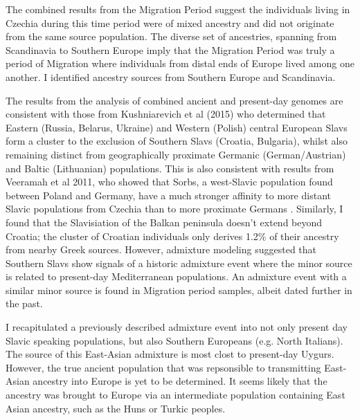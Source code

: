 The combined results from the Migration Period suggest the individuals living in Czechia during this time period were of mixed ancestry and did not originate from the same source population. The diverse set of ancestries, spanning from Scandinavia to Southern Europe imply that the Migration Period was truly a period of Migration where individuals from distal ends of Europe lived among one another. I identified ancestry sources from Southern Europe and Scandinavia. 

The results from the analysis of combined ancient and present-day genomes are consistent with those from Kushniarevich et al (2015) \cite{Kushniarevich23015} who determined that Eastern (Russia, Belarus, Ukraine) and Western (Polish) central European Slavs form a cluster to the exclusion of Southern Slavs (Croatia, Bulgaria), whilst also remaining distinct from geographically proximate Germanic (German/Austrian) and Baltic (Lithuanian) populations. This is also consistent with results from Veeramah et al 2011, who showed that Sorbs, a west-Slavic population found between Poland and Germany, have a much stronger affinity to more distant Slavic populations from Czechia than to more proximate Germans \cite{veeramah2011genetic}. Similarly, I found that the Slavisiation of the Balkan peninsula doesn't extend beyond Croatia; the cluster of Croatian individuals only derives 1.2\% of their ancestry from nearby Greek sources. However, admixture modeling suggested that Southern Slavs show signals of a historic admixture event where the minor source is related to present-day Mediterranean populations. An admixture event with a similar minor source is found in Migration period samples, albeit dated further in the past. 

I recapitulated a previously described admixture event into not only present day Slavic speaking populations, but also Southern Europeans (e.g. North Italians). The source of this East-Asian admixture is most clost to present-day Uygurs. However, the true ancient population that was repsonsible to transmitting East-Asian ancestry into Europe is yet to be determined. It seems likely that the ancestry was brought to Europe via an intermediate population containing East Asian ancestry, such as the Huns or Turkic peoples. 

